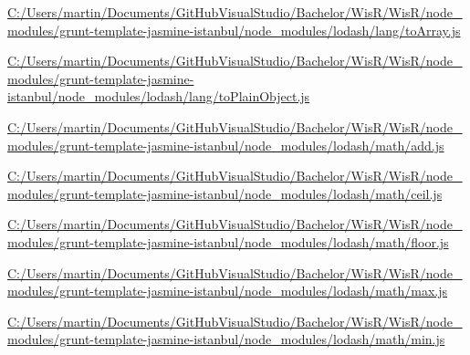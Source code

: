 \begin{DoxyCompactItemize}
\item 
\hyperlink{_c_1_2_users_2martin_2_documents_2_git_hub_visual_studio_2_bachelor_2_wis_r_2_wis_r_2node_modulef400d8b67b114536f53ee203530ce33a}{C\+:/\+Users/martin/\+Documents/\+Git\+Hub\+Visual\+Studio/\+Bachelor/\+Wis\+R/\+Wis\+R/node\+\_\+modules/grunt-\/template-\/jasmine-\/istanbul/node\+\_\+modules/lodash/lang/to\+Array.\+js}
\item 
\hyperlink{_c_1_2_users_2martin_2_documents_2_git_hub_visual_studio_2_bachelor_2_wis_r_2_wis_r_2node_moduleaf4f7a29251a06eca9f28199f54cd220}{C\+:/\+Users/martin/\+Documents/\+Git\+Hub\+Visual\+Studio/\+Bachelor/\+Wis\+R/\+Wis\+R/node\+\_\+modules/grunt-\/template-\/jasmine-\/istanbul/node\+\_\+modules/lodash/lang/to\+Plain\+Object.\+js}
\item 
\hyperlink{_c_1_2_users_2martin_2_documents_2_git_hub_visual_studio_2_bachelor_2_wis_r_2_wis_r_2node_module2a04e5586b4262d3ee012b77f86b305a}{C\+:/\+Users/martin/\+Documents/\+Git\+Hub\+Visual\+Studio/\+Bachelor/\+Wis\+R/\+Wis\+R/node\+\_\+modules/grunt-\/template-\/jasmine-\/istanbul/node\+\_\+modules/lodash/math/add.\+js}
\item 
\hyperlink{_c_1_2_users_2martin_2_documents_2_git_hub_visual_studio_2_bachelor_2_wis_r_2_wis_r_2node_moduled2b674db9db96ea11de28ed69d07d8fd}{C\+:/\+Users/martin/\+Documents/\+Git\+Hub\+Visual\+Studio/\+Bachelor/\+Wis\+R/\+Wis\+R/node\+\_\+modules/grunt-\/template-\/jasmine-\/istanbul/node\+\_\+modules/lodash/math/ceil.\+js}
\item 
\hyperlink{_c_1_2_users_2martin_2_documents_2_git_hub_visual_studio_2_bachelor_2_wis_r_2_wis_r_2node_module3ecd4569d5e8ffd64b9f0c95714f1e60}{C\+:/\+Users/martin/\+Documents/\+Git\+Hub\+Visual\+Studio/\+Bachelor/\+Wis\+R/\+Wis\+R/node\+\_\+modules/grunt-\/template-\/jasmine-\/istanbul/node\+\_\+modules/lodash/math/floor.\+js}
\item 
\hyperlink{_c_1_2_users_2martin_2_documents_2_git_hub_visual_studio_2_bachelor_2_wis_r_2_wis_r_2node_module67eb41ec72958110dc86cec2c4e9728c}{C\+:/\+Users/martin/\+Documents/\+Git\+Hub\+Visual\+Studio/\+Bachelor/\+Wis\+R/\+Wis\+R/node\+\_\+modules/grunt-\/template-\/jasmine-\/istanbul/node\+\_\+modules/lodash/math/max.\+js}
\item 
\hyperlink{_c_1_2_users_2martin_2_documents_2_git_hub_visual_studio_2_bachelor_2_wis_r_2_wis_r_2node_moduleca3fd70f9fe52483b11104f94aabcca0}{C\+:/\+Users/martin/\+Documents/\+Git\+Hub\+Visual\+Studio/\+Bachelor/\+Wis\+R/\+Wis\+R/node\+\_\+modules/grunt-\/template-\/jasmine-\/istanbul/node\+\_\+modules/lodash/math/min.\+js}

\end{DoxyCompactItemize}
